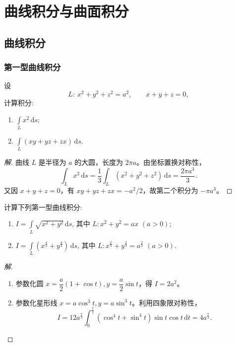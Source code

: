 \documentclass[../../数学分析培优讲义(答案版).tex]{subfiles}
\begin{document}
\setcounter{chapter}{12}
\pagestyle{fancy}

\chapter{曲线积分与曲面积分}

\section{曲线积分}

\subsection{第一型曲线积分}

\begin{example}
设
\[
    L:\ x^2+y^2+z^2=a^2,\qquad x+y+z=0,
\]
计算积分:
\begin{enumerate}[label=(\arabic*)]
    \item $\displaystyle\int\limits_L x^2\,\mathrm{d}s$;
    \item $\displaystyle\int\limits_L(xy+yz+zx)\,\mathrm{d}s$.
\end{enumerate}
\end{example}

\begin{proof}[解]
曲线 $L$ 是半径为 $a$ 的大圆，长度为 $2\pi a$。由坐标置换对称性，
\[
\int_Lx^2\,\mathrm{d}s=\dfrac{1}{3}\int_L(x^2+y^2+z^2)\,\mathrm{d}s=\dfrac{2\pi a^3}{3}.
\]
又因 $x+y+z=0$，有 $xy+yz+zx=-a^2/2$，故第二个积分为 $-\pi a^3$。
\end{proof}

\begin{example}
计算下列第一型曲线积分:
\begin{enumerate}[label=(\arabic*)]
    \item $\displaystyle I=\int\limits_L\sqrt{x^2+y^2}\,\mathrm{d}s$, 其中 $L:x^2+y^2=ax$ $(a>0)$;
    \item $\displaystyle I=\int\limits_L\left(x^{\frac{4}{3}}+y^{\frac{4}{3}}\right)\,\mathrm{d}s$, 其中 $L:x^{\frac{2}{3}}+y^{\frac{2}{3}}=a^{\frac{2}{3}}$ $(a>0)$.
\end{enumerate}
\end{example}

\begin{proof}[解]
\begin{enumerate}[label=(\arabic*)]
\item 参数化圆 $x=\dfrac{a}{2}(1+\cos t),y=\dfrac{a}{2}\sin t$，得 $I=2a^2$。
\item 参数化星形线 $x=a\cos^3t,y=a\sin^3t$。利用四象限对称性，
\[
I=12a^{\frac{7}{3}}\int_0^{\frac{\pi}{2}}(\cos^4t+\sin^4t)\sin t\cos t\,\mathrm{d}t=4a^{\frac{7}{3}}.
\]
\end{enumerate}
\end{proof}
\end{document}
